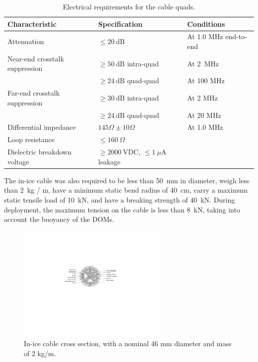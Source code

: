 \begin{table}[h]
  \centering
  \caption{Electrical requirements for the cable quads.} 
  \begin{tabularx}{\textwidth}{ l X  X  }
    \toprule
    Characteristic& Specification & Conditions \\
    \midrule

    Attenuation & $\le20~\mathrm{dB}$ & At 1.0 MHz end-to-end \\

    Near-end crosstalk suppression& $\ge50~\mathrm{dB}$ intra-quad & At 2~MHz \\

      &$\ge24~\mathrm{dB}$ quad-quad& At 100 MHz\\

    Far-end crosstalk suppression& $\ge30~\mathrm{dB}$ intra-quad & At 2 MHz \\

      &$\ge24~\mathrm{dB}$ quad-quad& At 20 MHz\\

    Differential impedance & $145\Omega \pm 10\Omega$ & At 1.0 MHz \\

    Loop resistance & $\le160~\Omega$ & \\

    Dielectric breakdown voltage & $\ge2000~\mathrm{VDC}$, $\le1~\mu\mathrm{A}$ leakage & \\
    \bottomrule  
  \end{tabularx}
  \label{tab:quad_requirements}
\end{table}

 The in-ice cable was also required to be less than 50~mm in
 diameter, weigh less than 2~kg / m, have a minimum static bend radius of 40~cm,
 carry a maximum static tensile load of 10~kN, and have a breaking strength
 of 40~kN. During deployment, the maximum tension on the cable is less
 than 8~kN, taking into account the buoyancy of the DOMs.
 
\begin{figure}
  \centering
  \includegraphics[width=0.65\textwidth]{graphics/cables/labeled_inice_xsection.pdf}
  \caption{\label{fig:cable_xsection}In-ice cable cross
    section, with a nominal 46 mm diameter and mass of 2 kg/m.} 
\end{figure}

